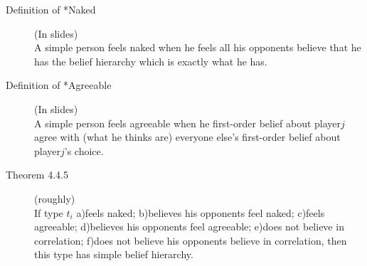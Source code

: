 \documentclass{article}
\begin{document}
\begin{description}
  \item[Definition of *Naked] (In slides)\\
  A simple person feels naked when he feels all his opponents believe that he has the belief hierarchy which is exactly what he has.
  \item[Definition of *Agreeable] (In slides)\\
  A simple person feels agreeable when he first-order belief about player$j$ agree with (what he thinks are) everyone else's first-order belief about player$j$'s choice.
  \item[Theorem 4.4.5](roughly)\\
  If type $t_i$ a)feels naked; b)believes his opponents feel naked; c)feels agreeable; d)believes his opponents feel agreeable; e)does not believe in correlation; f)does not believe his opponents believe in correlation, then this type has simple belief hierarchy.
\end{description}
\end{document}
